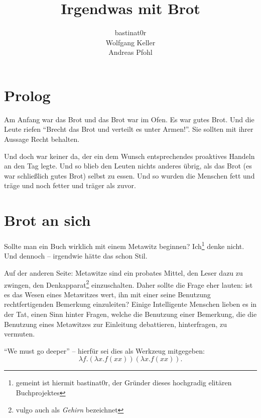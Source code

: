 \documentclass{scrbook}
\title{Irgendwas mit Brot}
\author{bastinat0r \\ Wolfgang Keller \\ Andreas Pfohl}
\begin{document}
\maketitle

\chapter*{Prolog}

Am Anfang war das Brot und das Brot war im Ofen. Es war gutes Brot. Und die Leute riefen "`Brecht das Brot und verteilt es unter Armen!"'.
Sie sollten mit ihrer Aussage Recht behalten. %

Und doch war keiner da, der ein dem Wunsch entsprechendes proaktives Handeln an den Tag legte. Und so blieb den Leuten nichts anderes übrig, als das Brot (es war schließlich gutes Brot) selbst zu essen.
Und so wurden die Menschen fett und träge und noch fetter und träger als zuvor.

\chapter{Brot an sich}

Sollte man ein Buch wirklich mit einem Metawitz beginnen? Ich\footnote{gemeint ist hiermit bastinat0r, der Gründer dieses hochgradig elitären Buchprojektes} denke nicht. Und dennoch – irgendwie hätte das schon Stil.

Auf der anderen Seite: Metawitze sind ein probates Mittel, den Leser dazu zu zwingen, den Denkapparat\footnote{vulgo auch als \emph{Gehirn} bezeichnet} einzuschalten.
Daher sollte die Frage eher lauten: ist es das Wesen eines Metawitzes wert, ihn mit einer seine Benutzung rechtfertigenden Bemerkung einzuleiten?
Einige Intelligente Menschen lieben es in der Tat, einen Sinn hinter Fragen, welche die Benutzung einer Bemerkung, die die Benutzung eines Metawitzes zur Einleitung debattieren, hinterfragen, zu vermuten.

"`We must go deeper"' -- hierfür sei dies als Werkzeug mitgegeben:
\begin{displaymath}
\lambda f.(\lambda x.f (x x)) (\lambda x.f (x x)).
\end{displaymath}
%
\end{document}
